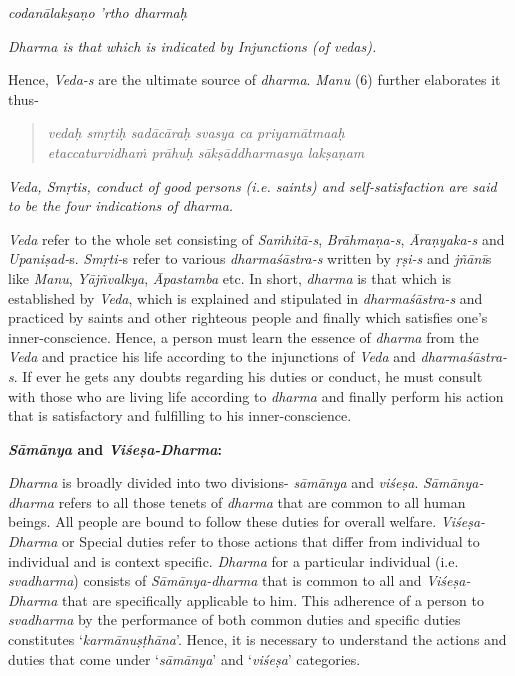 \emph{codanālakṣaṇo 'rtho dharmaḥ }

\emph{Dharma is that which is indicated by Injunctions (of vedas).}

Hence, \emph{Veda-s} are the ultimate source of \emph{dharma}. \emph{Manu} (6) further elaborates it thus-

\begin{verse}
\emph{vedaḥ smṛtiḥ sadācāraḥ svasya ca priyamātmaaḥ }\\
\emph{etaccaturvidhaṁ prāhuḥ sākṣāddharmasya lakṣaṇam }
\end{verse}

\emph{Veda, Smṛtis, conduct of good persons (i.e. saints) and self-satisfaction are said to be the four indications of dharma.}

\emph{Veda} refer to the whole set consisting of \emph{Saṁhitā-s}, \emph{Brāhmaṇa-s}, \emph{Āraṇyaka-s} and \emph{Upaniṣad-}s. \emph{Smṛti-}s refer to various \emph{dharmaśāstra-s} written by \emph{ṛṣi-s} and \emph{jñānī}s like \emph{Manu}, \emph{Yājñvalkya}, \emph{Āpastamba} etc. In short, \emph{dharma} is that which is established by \emph{Veda}, which is explained and stipulated in \emph{dharmaśāstra-s} and practiced by saints and other righteous people and finally which satisfies one's inner-conscience. Hence, a person must learn the essence of \emph{dharma} from the \emph{Veda} and practice his life according to the injunctions of \emph{Veda} and \emph{dharmaśāstra-s}. If ever he gets any doubts regarding his duties or conduct, he must consult with those who are living life according to \emph{dharma} and finally perform his action that is satisfactory and fulfilling to his inner-conscience.

\textbf{\emph{Sāmānya} and \emph{Viśeṣa-Dharma}:}

\emph{Dharma} is broadly divided into two divisions- \emph{sāmānya} and \emph{viśeṣa}. \emph{Sāmānya-dharma} refers to all those tenets of \emph{dharma} that are common to all human beings. All people are bound to follow these duties for overall welfare. \emph{Viśeṣa-Dharma} or Special duties refer to those actions that differ from individual to individual and is context specific. \emph{Dharma} for a particular individual (i.e. \emph{svadharma}) consists of \emph{Sāmānya-dharma} that is common to all and \emph{Viśeṣa-Dharma} that are specifically applicable to him. This adherence of a person to \emph{svadharma} by the performance of both common duties and specific duties constitutes `\emph{karmānuṣṭhāna}'. Hence, it is necessary to understand the actions and duties that come under `\emph{sāmānya}' and `\emph{viśeṣa}' categories.

